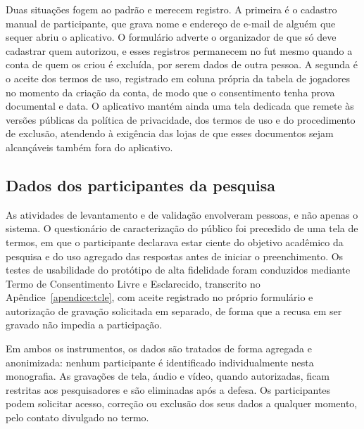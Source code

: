         Duas situações fogem ao padrão e merecem registro. A primeira é o cadastro manual de participante, que grava nome e endereço de e-mail de alguém que sequer abriu o aplicativo. O formulário adverte o organizador de que só deve cadastrar quem autorizou, e esses registros permanecem no fut mesmo quando a conta de quem os criou é excluída, por serem dados de outra pessoa. A segunda é o aceite dos termos de uso, registrado em coluna própria da tabela de jogadores no momento da criação da conta, de modo que o consentimento tenha prova documental e data. O aplicativo mantém ainda uma tela dedicada que remete às versões públicas da política de privacidade, dos termos de uso e do procedimento de exclusão, atendendo à exigência das lojas de que esses documentos sejam alcançáveis também fora do aplicativo.

    \subsection{Dados dos participantes da pesquisa}
        As atividades de levantamento e de validação envolveram pessoas, e não apenas o sistema. O questionário de caracterização do público foi precedido de uma tela de termos, em que o participante declarava estar ciente do objetivo acadêmico da pesquisa e do uso agregado das respostas antes de iniciar o preenchimento. Os testes de usabilidade do protótipo de alta fidelidade foram conduzidos mediante Termo de Consentimento Livre e Esclarecido, transcrito no Apêndice~\ref{apendice:tcle}, com aceite registrado no próprio formulário e autorização de gravação solicitada em separado, de forma que a recusa em ser gravado não impedia a participação.

        Em ambos os instrumentos, os dados são tratados de forma agregada e anonimizada: nenhum participante é identificado individualmente nesta monografia. As gravações de tela, áudio e vídeo, quando autorizadas, ficam restritas aos pesquisadores e são eliminadas após a defesa. Os participantes podem solicitar acesso, correção ou exclusão dos seus dados a qualquer momento, pelo contato divulgado no termo.


